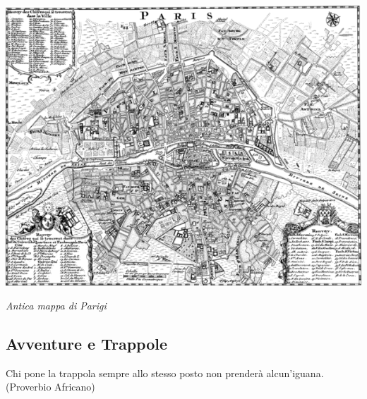 \begin{center}
\includegraphics[width=0.9\linewidth]{immagini/mappaparigi.png}

\emph{Antica mappa di Parigi}
\end{center}

\pagebreak

\subsection{Avventure e Trappole}\label{trappole}

\begin{changemargin}{0.3cm}{0.3cm}\begin{enfasi}{
Chi pone la trappola sempre allo stesso posto non prenderà alcun'iguana. (Proverbio Africano)}\end{enfasi}\end{changemargin}\medskip

